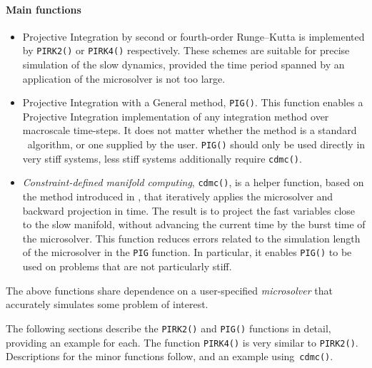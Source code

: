 \paragraph{Main functions}
\begin{itemize}
\item Projective Integration by second or fourth-order Runge--Kutta is implemented by \verb|PIRK2()| or \verb|PIRK4()| respectively.
These schemes are suitable for precise simulation of the slow dynamics, provided the time period spanned by an application of the microsolver is not too large.

\item Projective Integration with a General method, \verb|PIG()|.
This function enables a Projective Integration implementation of any integration method over macroscale time-steps.
It does not matter whether the method is a standard \script\ algorithm, or one supplied by the user.
\verb|PIG()| should only be used directly in very stiff systems, less stiff systems additionally require \verb|cdmc()|. 

\item \emph{Constraint-defined manifold computing}, \verb|cdmc()|, is a helper function, based on the method introduced in \cite{Gear04},  that iteratively applies the microsolver and backward projection in time.
The result is to project the fast variables close to the slow manifold, without advancing the current time by the burst time of the microsolver.
This function reduces errors related to the simulation length of the microsolver in the \verb|PIG| function.
In particular, it enables \verb|PIG()| to be used on problems that are not particularly stiff.
\end{itemize}

The above functions share dependence on a user-specified \emph{microsolver} that accurately simulates some problem of interest. 


The following sections describe the \verb|PIRK2()| and \verb|PIG()| functions in detail, providing an example for each.
The function \verb|PIRK4()| is very similar to \verb|PIRK2()|.
Descriptions for the minor functions follow, and an example using~\verb|cdmc()|.







